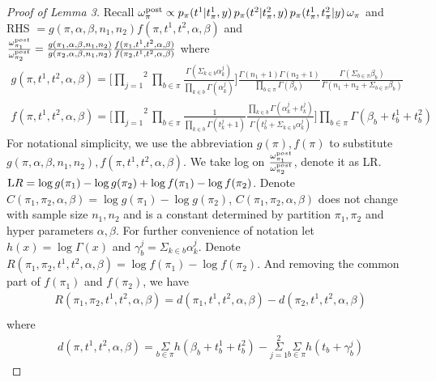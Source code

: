 \documentclass[aoas,preprint]{imsart}
\begin{document}
\begin{proof}[Proof of Lemma 3]
Recall $ \omega^{\rm post}_\pi \propto 
 p_\pi(t^1 | t^1_{\pi},y)\, p_\pi(t^2|  t^2_{\pi},y )
 \, p_\pi( t^1_{\pi}, t^2_{\pi} | y ) \, \omega_\pi$ and \\
 RHS $=  g(\pi, \alpha, \beta, n_1, n_2) f(\pi, t^1, t^2, \alpha, \beta)$ and $\frac{\omega_{\pi_1}^{\text post}}{\omega_{\pi_2}^{\text post}} = \frac{g(\pi_1, \alpha, \beta, n_1, n_2)}{g(\pi_2, \alpha, \beta, n_1, n_2)}\frac{f(\pi_1, t^1, t^2, \alpha, \beta)}{f(\pi_2, t^1, t^2, \alpha, \beta)}$
 where \begin{eqnarray*}
 g(\pi, t^1, t^2, \alpha, \beta) = \big[ \overset{2}{\underset{j = 1}{\prod}}\underset{b\in \pi}\prod \frac{\Gamma(\Sigma_{k\in b} \alpha_k^j)}{\prod_{k\in b} \Gamma(\alpha_k^j)} \big ] \frac{\Gamma(n_1 + 1) \Gamma(n_2 + 1)}{\prod_{b\in \pi} \Gamma(\beta_b)} \frac{\Gamma(\Sigma_{b \in \pi} \beta_b)}{\Gamma(n_1 + n_2 + \Sigma_{b\in\pi} \beta_b)}\\
f(\pi, t^1, t^2, \alpha, \beta) = \big[ \overset{2}{\underset{j = 1}{\prod}}\underset{b\in \pi}\prod \frac{1}{\prod_{k \in b}\Gamma(t_k^j + 1)}\frac{\prod_{k \in b}\Gamma(\alpha_k^j + t_k^j)}{\Gamma(t_b^j + \Sigma_{k\in b}\alpha_k^j)}\big ] \underset{b\in \pi}\prod \Gamma(\beta_b + t_b^1 + t_b^2) 
\end{eqnarray*}
For notational simplicity, we use the abbreviation $g(\pi), f(\pi)$ to substitute \\
$g(\pi, \alpha, \beta, n_1, n_2),f(\pi, t^1, t^2, \alpha, \beta)$.  We take log on $\frac{\omega_{\pi_1}^{\text post}}{\omega_{\pi_2}^{\text post}}$, denote it as LR. $\text LR = \log g(\pi_1) - \log g(\pi_2) + \log f(\pi_1) - \log f(\pi_2)$. Denote $C(\pi_1, \pi_2, \alpha, \beta) = \log g(\pi_1) - \log g(\pi_2)$, $C(\pi_1, \pi_2, \alpha, \beta)$ does not change with sample size $n_1, n_2$ and is a constant determined by partition $\pi_1, \pi_2$ and hyper parameters $\alpha, \beta$.  For further convenience of notation let $h(x) = \log \Gamma(x)$ and $\gamma_b^j = \Sigma_{k\in b} \alpha_k^j$. Denote $R(\pi_1, \pi_2, t^1, t^2, \alpha, \beta) = \log f(\pi_1) - \log f(\pi_2)$. And removing the common part of $f(\pi_1)$ and $f(\pi_2)$, we have 
\begin{eqnarray*}
R(\pi_1, \pi_2, t^1, t^2, \alpha, \beta) = d(\pi_1, t^1, t^2, \alpha, \beta) - d(\pi_2, t^1, t^2, \alpha, \beta)\\
\end{eqnarray*}
where
\begin{eqnarray*}
d(\pi, t^1, t^2, \alpha, \beta) = \underset{b\in \pi}\Sigma h(\beta_b + t_b^1 + t_b^2) - \overset{2}{\underset{j = 1}{\Sigma}} \underset{b\in \pi}\Sigma h(t_b + \gamma_b^j)
\end{eqnarray*}



\end{proof}
\end{document}
